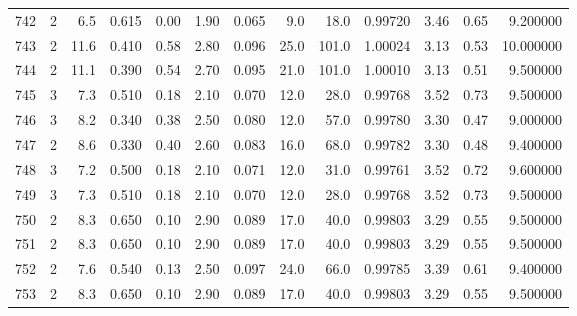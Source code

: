 \begin{tabular}{lrrrrrrrrrrrr}
742  &        2 &            6.5 &             0.615 &         0.00 &            1.90 &      0.065 &                  9.0 &                  18.0 &  0.99720 &  3.46 &       0.65 &   9.200000 \\
743  &        2 &           11.6 &             0.410 &         0.58 &            2.80 &      0.096 &                 25.0 &                 101.0 &  1.00024 &  3.13 &       0.53 &  10.000000 \\
744  &        2 &           11.1 &             0.390 &         0.54 &            2.70 &      0.095 &                 21.0 &                 101.0 &  1.00010 &  3.13 &       0.51 &   9.500000 \\
745  &        3 &            7.3 &             0.510 &         0.18 &            2.10 &      0.070 &                 12.0 &                  28.0 &  0.99768 &  3.52 &       0.73 &   9.500000 \\
746  &        3 &            8.2 &             0.340 &         0.38 &            2.50 &      0.080 &                 12.0 &                  57.0 &  0.99780 &  3.30 &       0.47 &   9.000000 \\
747  &        2 &            8.6 &             0.330 &         0.40 &            2.60 &      0.083 &                 16.0 &                  68.0 &  0.99782 &  3.30 &       0.48 &   9.400000 \\
748  &        3 &            7.2 &             0.500 &         0.18 &            2.10 &      0.071 &                 12.0 &                  31.0 &  0.99761 &  3.52 &       0.72 &   9.600000 \\
749  &        3 &            7.3 &             0.510 &         0.18 &            2.10 &      0.070 &                 12.0 &                  28.0 &  0.99768 &  3.52 &       0.73 &   9.500000 \\
750  &        2 &            8.3 &             0.650 &         0.10 &            2.90 &      0.089 &                 17.0 &                  40.0 &  0.99803 &  3.29 &       0.55 &   9.500000 \\
751  &        2 &            8.3 &             0.650 &         0.10 &            2.90 &      0.089 &                 17.0 &                  40.0 &  0.99803 &  3.29 &       0.55 &   9.500000 \\
752  &        2 &            7.6 &             0.540 &         0.13 &            2.50 &      0.097 &                 24.0 &                  66.0 &  0.99785 &  3.39 &       0.61 &   9.400000 \\
753  &        2 &            8.3 &             0.650 &         0.10 &            2.90 &      0.089 &                 17.0 &                  40.0 &  0.99803 &  3.29 &       0.55 &   9.500000 \\

\end{tabular}
